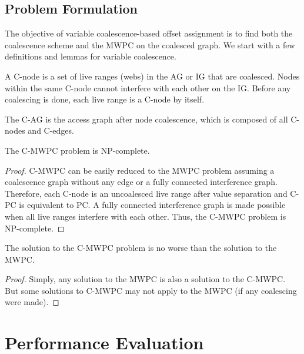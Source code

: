 \documentclass[prodmode,acmtecs]{acmsmall}
\begin{document}
\subsection{Problem Formulation}

The objective of variable coalescence-based offset assignment is to find
both the coalescence scheme and the MWPC on the coalesced graph. We start
with a few definitions and lemmas for variable coalescence.

\begin{definition}A C-node is a set of
live ranges (webs) in the AG or IG that are coalesced. Nodes within the same
C-node cannot interfere with each other on the IG. Before any coalescing is
done, each live range is a C-node by itself.
\end{definition}

\begin{definition}The C-AG is the access
graph after node coalescence, which is composed of all C-nodes and C-edges.
\end{definition}

\begin{lemma}
The C-MWPC problem is NP-complete.
\end{lemma}
\begin{proof} C-MWPC can be easily reduced to the MWPC problem assuming a
coalescence graph without any edge or a fully connected interference graph.
Therefore, each C-node is an uncoalesced live range after value separation
and C-PC is equivalent to PC. A fully connected interference graph is made
possible when all live ranges interfere with each other. Thus, the C-MWPC
problem is NP-complete.
\end{proof}

\begin{lemma}The solution to the C-MWPC problem is no
worse than the solution to the MWPC.
\end{lemma}
\begin{proof}
Simply, any solution to the MWPC is also a solution to the
C-MWPC. But some solutions to C-MWPC may not apply to the MWPC (if any
coalescing were made).
\end{proof}

\section{Performance Evaluation}
\end{document}
